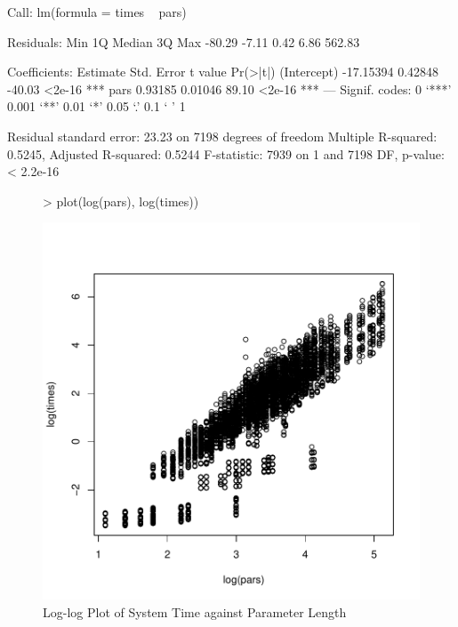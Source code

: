 \begin{Schunk}
\begin{Soutput}
Call:
lm(formula = times ~ pars)

Residuals:
   Min     1Q Median     3Q    Max 
-80.29  -7.11   0.42   6.86 562.83 

Coefficients:
             Estimate Std. Error t value Pr(>|t|)    
(Intercept) -17.15394    0.42848  -40.03   <2e-16 ***
pars          0.93185    0.01046   89.10   <2e-16 ***
---
Signif. codes:  0 ‘***’ 0.001 ‘**’ 0.01 ‘*’ 0.05 ‘.’ 0.1 ‘ ’ 1

Residual standard error: 23.23 on 7198 degrees of freedom
Multiple R-squared:  0.5245,	Adjusted R-squared:  0.5244 
F-statistic:  7939 on 1 and 7198 DF,  p-value: < 2.2e-16
\end{Soutput}
\end{Schunk}

\begin{figure}[h]
    \centering
\begin{Schunk}
\begin{Sinput}
> plot(log(pars), log(times))
\end{Sinput}
\end{Schunk}
\includegraphics{chapter1-figtime}
    \caption{Log-log Plot of System Time against Parameter Length}
    \label{fig:time}
\end{figure}


